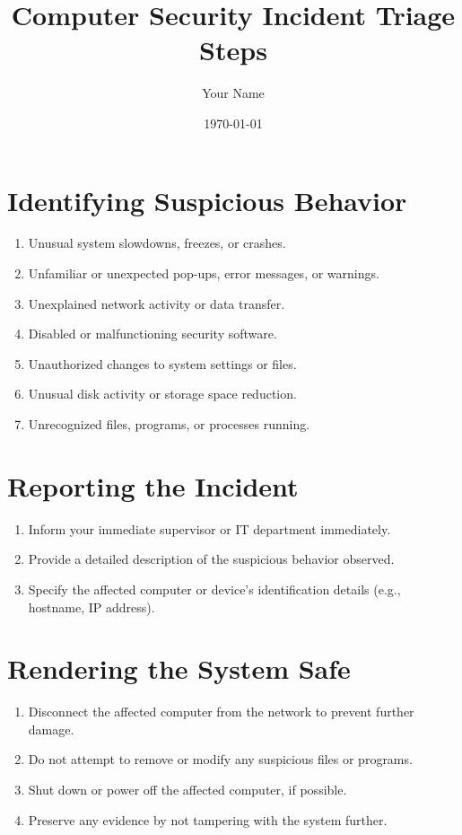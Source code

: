 \documentclass{article}
\begin{document}
\title{\textbf{Computer Security Incident Triage Steps}}
\author{Your Name}
\date{\today}

\maketitle

\section{Identifying Suspicious Behavior}
\begin{enumerate}
    \item Unusual system slowdowns, freezes, or crashes.
    \item Unfamiliar or unexpected pop-ups, error messages, or warnings.
    \item Unexplained network activity or data transfer.
    \item Disabled or malfunctioning security software.
    \item Unauthorized changes to system settings or files.
    \item Unusual disk activity or storage space reduction.
    \item Unrecognized files, programs, or processes running.
\end{enumerate}

\section{Reporting the Incident}
\begin{enumerate}
    \item Inform your immediate supervisor or IT department immediately.
    \item Provide a detailed description of the suspicious behavior observed.
    \item Specify the affected computer or device's identification details (e.g., hostname, IP address).
\end{enumerate}

\section{Rendering the System Safe}
\begin{enumerate}
    \item Disconnect the affected computer from the network to prevent further damage.
    \item Do not attempt to remove or modify any suspicious files or programs.
    \item Shut down or power off the affected computer, if possible.
    \item Preserve any evidence by not tampering with the system further.
\end{enumerate}
\end{document}
